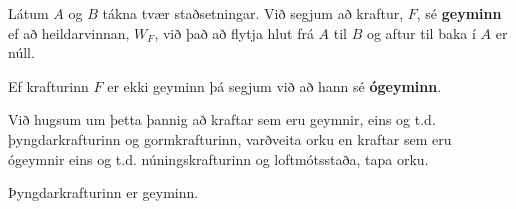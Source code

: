 \ifdefined \wholebook \else\documentclass[oneside]{book}\usepackage{EdlBook}\graphicspath{{figures/}}
\begin{document}
\begin{tcolorbox}
\begin{definition}
Látum $A$ og $B$ tákna tvær staðsetningar. Við segjum að kraftur, $F$, sé \textbf{geyminn} ef að heildarvinnan, $W_F$, við það að flytja hlut frá $A$ til $B$ og aftur til baka í $A$ er núll.
\end{definition}
\end{tcolorbox}

\begin{tcolorbox}
\begin{definition}
Ef krafturinn $F$ er ekki geyminn þá segjum við að hann sé \textbf{ógeyminn}.
\end{definition}
\end{tcolorbox}

Við hugsum um þetta þannig að kraftar sem eru geymnir, eins og t.d. þyngdarkrafturinn og gormkrafturinn, varðveita orku en kraftar sem eru ógeymnir eins og t.d. núningskrafturinn og loftmótsstaða, tapa orku.

\begin{tcolorbox}
\begin{theorem}
Þyngdarkrafturinn er geyminn.
\end{theorem}
\end{tcolorbox}
\end{document}
